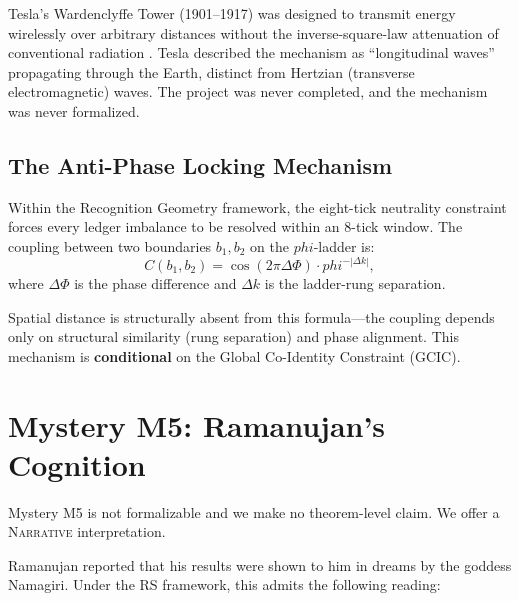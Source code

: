 \documentclass[11pt]{article}
\def\phig{phi}
\theoremstyle{plain}
\theoremstyle{definition}
\theoremstyle{remark}
\newcommand{\phig}{\varphi}
\begin{document}
Tesla's Wardenclyffe Tower (1901--1917) was designed to transmit energy wirelessly over arbitrary distances without the inverse-square-law attenuation of conventional radiation \cite{Carlson2013}.
Tesla described the mechanism as ``longitudinal waves'' propagating through the Earth, distinct from Hertzian (transverse electromagnetic) waves.
The project was never completed, and the mechanism was never formalized.

\subsection{The Anti-Phase Locking Mechanism}

Within the Recognition Geometry framework, the eight-tick neutrality constraint forces every ledger imbalance to be resolved within an 8-tick window.
The coupling between two boundaries $b_1, b_2$ on the $\phig$-ladder is:
\begin{equation}\label{eq:coupling}
C(b_1, b_2) = \cos(2\pi\Delta\Phi) \cdot \phig^{-|\Delta k|},
\end{equation}
where $\Delta\Phi$ is the phase difference and $\Delta k$ is the ladder-rung separation.

Spatial distance is structurally absent from this formula---the coupling depends only on structural similarity (rung separation) and phase alignment.
This mechanism is \textbf{conditional} on the Global Co-Identity Constraint (GCIC).

\section{Mystery M5: Ramanujan's Cognition}
\label{sec:cognition}

Mystery M5 is not formalizable and we make no theorem-level claim.
We offer a \textsc{Narrative} interpretation.

Ramanujan reported that his results were shown to him in dreams by the
goddess Namagiri. Under the RS framework, this admits the following reading:
\end{document}
